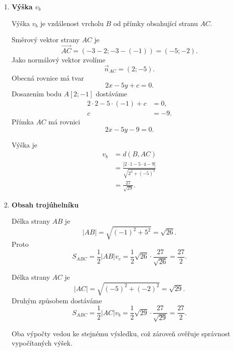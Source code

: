 \begin{example}
\begin{enumerate}[label=\alph*), leftmargin=2em]
        \item \textbf{Výška $v_b$}

        Výška $v_b$ je vzdálenost vrcholu $B$ od přímky obsahující
        stranu $AC$.

        Směrový vektor strany $AC$ je
        \[
            \overrightarrow{AC}
            =
            (-3-2;-3-(-1))
            =
            (-5;-2).
        \]
        Jako normálový vektor zvolíme
        \[
            \vec{n}_{AC}=(2;-5).
        \]
        Obecná rovnice má tvar
        \[
            2x-5y+c=0.
        \]
        Dosazením bodu $A[2;-1]$ dostáváme
        \begin{align*}
            2\cdot2-5\cdot(-1)+c&=0,\\
            c&=-9.
        \end{align*}
        Přímka $AC$ má rovnici
        \[
            2x-5y-9=0.
        \]

        Výška je
        \begin{align*}
            v_b
            &=
            d(B,AC)\\
            &=
            \frac{|2\cdot1-5\cdot4-9|}{\sqrt{2^2+(-5)^2}}\\
            &=
            \frac{27}{\sqrt{29}}.
        \end{align*}

        \item \textbf{Obsah trojúhelníku}

        Délka strany $AB$ je
        \[
            |AB|
            =
            \sqrt{(-1)^2+5^2}
            =
            \sqrt{26}.
        \]
        Proto
        \[
            S_{ABC}
            =
            \frac12|AB|v_c
            =
            \frac12\sqrt{26}\cdot\frac{27}{\sqrt{26}}
            =
            \frac{27}{2}.
        \]

        Délka strany $AC$ je
        \[
            |AC|
            =
            \sqrt{(-5)^2+(-2)^2}
            =
            \sqrt{29}.
        \]
        Druhým způsobem dostáváme
        \[
            S_{ABC}
            =
            \frac12|AC|v_b
            =
            \frac12\sqrt{29}\cdot\frac{27}{\sqrt{29}}
            =
            \frac{27}{2}.
        \]

        Oba výpočty vedou ke stejnému výsledku, což zároveň ověřuje
        správnost vypočítaných výšek.
    \end{enumerate}
\end{example}

